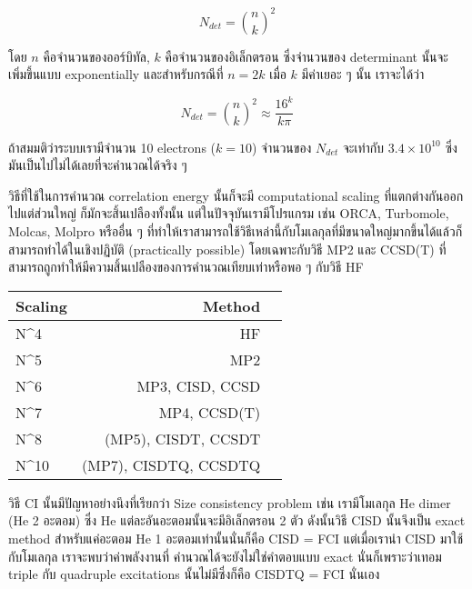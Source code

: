 \begin{equation}
    N_{det} = \binom{n}{k}^{2}
\end{equation}

\noindent โดย $n$ คือจำนวนของออร์บิทัล, $k$ คือจำนวนของอิเล็กตรอน ซึ่งจำนวนของ determinant
นั้นจะเพิ่มขึ้นแบบ exponentially และสำหรับกรณีที่ $n = 2k$ เมื่อ $k$ มีค่าเยอะ ๆ นั้น เราจะได้ว่า

\begin{equation}
    N_{det} = \binom{n}{k}^{2} \approx \frac{16^k}{k\pi}
\end{equation}

ถ้าสมมติว่าระบบเรามีจำนวน 10 electrons ($k = 10$) จำนวนของ $N_{det}$ จะเท่ากับ $3.4 \times 10^{10}$
ซึ่งมันเป็นไปไม่ได้เลยที่จะคำนวณได้จริง ๆ

วิธีที่ใช้ในการคำนวณ correlation energy นั้นก็จะมี computational scaling ที่แตกต่างกันออกไปแต่ส่วนใหญ่%
ก็มักจะสิ้นเปลืองทั้งนั้น แต่ในปัจจุบันเรามีโปรแกรม เช่น ORCA, Turbomole, Molcas, Molpro หรืออื่น ๆ
ที่ทำให้เราสามารถใช้วิธีเหล่านี้กับโมเลกุลที่มีขนาดใหญ่มากขึ้นได้แล้วก็สามารถทำได้ในเชิงปฏิบัติ (practically possible)
โดยเฉพาะกับวิธี MP2 และ CCSD(T) ที่สามารถถูกทำให้มีความสิ้นเปลืองของการคำนวณเทียบเท่าหรือพอ ๆ กับวิธี HF

\begin{table}[!htp]
    \Large
    \centering
    \begin{tabular}{lrr}\toprule
        Scaling & Method                \\\midrule
        N^4     & HF                    \\
        N^5     & MP2                   \\
        N^6     & MP3, CISD, CCSD       \\
        N^7     & MP4, CCSD(T)          \\
        N^8     & (MP5), CISDT, CCSDT   \\
        N^{10}  & (MP7), CISDTQ, CCSDTQ \\
        \bottomrule
    \end{tabular}
\end{table}

วิธี CI นั้นมีปัญหาอย่างนึงที่เรียกว่า Size consistency problem เช่น เรามีโมเลกุล He dimer (He 2 อะตอม)
ซึ่ง He แต่ละอันอะตอมนั้นจะมีอิเล็กตรอน 2 ตัว ดังนั้นวิธี CISD นั้นจึงเป็น exact method สำหรับแค่อะตอม He 1
อะตอมเท่านั้นนั่นก็คือ CISD = FCI แต่เมื่อเรานำ CISD มาใช้กับโมเลกุล  เราจะพบว่าค่าพลังงานที่%
คำนวณได้จะยังไม่ใช่คำตอบแบบ exact นั่นก็เพราะว่าเทอม triple กับ quadruple excitations นั้นไม่มีซึ่งก็คือ
CISDTQ = FCI นั่นเอง

